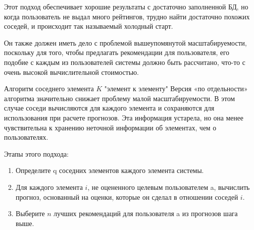 Этот подход обеспечивает хорошие результаты с достаточно заполненной БД, но когда пользователь не выдал много рейтингов, трудно найти достаточно похожих соседей, и происходит так называемый холодный старт.

Он также должен иметь дело с проблемой вышеупомянутой масштабируемости, поскольку для того, чтобы предлагать рекомендации для пользователя, его подобие с каждым из пользователей системы должно быть рассчитано, что-то с очень высокой вычислительной стоимостью.

Алгоритм соседнего элемента $K$ "элемент $к$ элементу"
Версия «по отдельности» алгоритма значительно снижает проблему малой масштабируемости. В этом случае соседи вычисляются для каждого элемента и сохраняются для использования при расчете прогнозов. Эта информация устарела, но она менее чувствительна к хранению неточной информации об элементах, чем о пользователях.


Этапы этого подхода:
\begin{enumerate}
	\item Определите q соседних элементов каждого элемента системы.
	\item Для каждого элемента $i$, не оцененного целевым пользователем a, вычислить прогноз, основанный на оценки, которые он сделал в отношении соседей $i$.
	\item Выберите $n$ лучших рекомендаций для пользователя a из прогнозов шага выше.
\end{enumerate}


